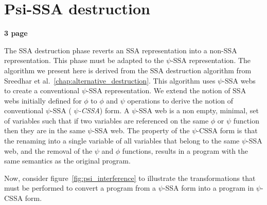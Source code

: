 \section{Psi-SSA destruction}
\label{sec:Psi_ssa_destruction}

\textbf{3 page}


The SSA destruction phase reverts an SSA representation into a non-SSA
representation. This phase must be adapted to the $\psi$-SSA
representation. The algorithm we present here is derived from the SSA
destruction algorithm from Sreedhar et
al.~\ref{chap:alternative_destruction}. This algorithm uses $\psi$-SSA
webs to create a conventional $\psi$-SSA representation. We extend the
notion of SSA webs initially defined for $\phi$ to $\phi$ and $\psi$
operations to derive the notion of conventional $\psi$-SSA ({\em
  $\psi$-CSSA}) form. A $\psi$-SSA web is a non empty, minimal, set of
variables such that if two variables are referenced on the same $\phi$
or $\psi$ function then they are in the same $\psi$-SSA web. The
property of the $\psi$-CSSA form is that the renaming into a single
variable of all variables that belong to the same $\psi$-SSA web, and
the removal of the $\psi$ and $\phi$ functions, results in a program
with the same semantics as the original program.


Now, consider figure~\ref{fig:psi_interference} to illustrate the
transformations that must be performed to convert a program from a
$\psi$-SSA form into a program in $\psi$-CSSA form.

